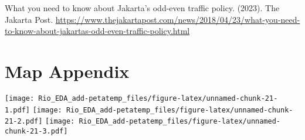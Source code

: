 \documentclass[
]{article}
\begin{document}
What you need to know about Jakarta's odd-even traffic policy. (2023).
The Jakarta Post.
\url{https://www.thejakartapost.com/news/2018/04/23/what-you-need-to-know-about-jakartas-odd-even-traffic-policy.html}

\hypertarget{map-appendix}{%
\section{Map Appendix}\label{map-appendix}}

\texttt{[image: Rio\_EDA\_add-petatemp\_files/figure-latex/unnamed-chunk-21-1.pdf]}
\texttt{[image: Rio\_EDA\_add-petatemp\_files/figure-latex/unnamed-chunk-21-2.pdf]}
\texttt{[image: Rio\_EDA\_add-petatemp\_files/figure-latex/unnamed-chunk-21-3.pdf]}
\end{document}
